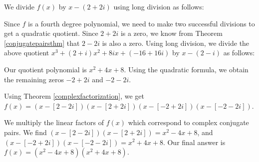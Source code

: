 {
\begin{enumerate}

{\item We divide $f(x)$ by $x-(2+2i)$ using long division as follows:}


\item  Since $f$ is a fourth degree polynomial, we need to make two successful divisions to get a quadratic quotient.  Since $2+2i$ is a zero, we know from Theorem \ref{conjugatepairsthm} that $2-2i$ is also a zero.  
{Using long division, we divide the above quotient $x^3+(2+i)x^2+8ix+(-16+16i)$ by $x-(2-i)$ as follows:}

Our quotient polynomial is $x^2+4x+8$.  Using the quadratic formula, we obtain the remaining zeros $-2+2i$ and $-2-2i$.  

\item  Using Theorem \ref{complexfactorization}, we get $f(x) = (x-[2-2i])(x-[2+2i])(x-[-2+2i])(x-[-2-2i])$.

\item  We multiply the linear factors of $f(x)$ which correspond to complex conjugate pairs.  We find $(x-[2-2i])(x-[2+2i]) = x^2-4x+8$, and $(x-[-2+2i])(x-[-2-2i]) = x^2+4x+8$.  Our final answer is $f(x) =  \left(x^2-4x+8\right) \left(x^2+4x+8\right)$. 
\end{enumerate}
}

